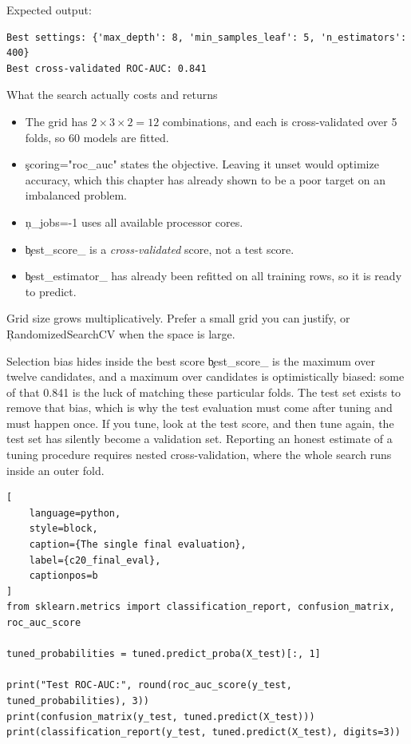 Expected output:

\begin{lstlisting}[language=text, style=block, caption={Twelve combinations, five folds, one winner}, label={c20_gridsearch_output}, captionpos=b]
Best settings: {'max_depth': 8, 'min_samples_leaf': 5, 'n_estimators': 400}
Best cross-validated ROC-AUC: 0.841
\end{lstlisting}

\begin{SyntaxBox}{What the search actually costs and returns}
\begin{itemize}
    \item The grid has $2 \times 3 \times 2 = 12$ combinations, and each is
          cross-validated over 5 folds, so 60 models are fitted.
    \item \c{scoring="roc_auc"} states the objective. Leaving it unset would
          optimize accuracy, which this chapter has already shown to be a poor
          target on an imbalanced problem.
    \item \c{n_jobs=-1} uses all available processor cores.
    \item \c{best_score_} is a \emph{cross-validated} score, not a test score.
    \item \c{best_estimator_} has already been refitted on all training rows, so
          it is ready to predict.
\end{itemize}
Grid size grows multiplicatively. Prefer a small grid you can justify, or
\c{RandomizedSearchCV} when the space is large.
\end{SyntaxBox}

\begin{ExplainBox}{Selection bias hides inside the best score}
\c{best_score_} is the maximum over twelve candidates, and a maximum over
candidates is optimistically biased: some of that 0.841 is the luck of matching
these particular folds. The test set exists to remove that bias, which is why the
test evaluation must come after tuning and must happen once. If you tune, look at
the test score, and then tune again, the test set has silently become a
validation set. Reporting an honest estimate of a tuning procedure requires
nested cross-validation, where the whole search runs inside an outer fold.
\end{ExplainBox}


\begin{lstlisting}[
    language=python,
    style=block,
    caption={The single final evaluation},
    label={c20_final_eval},
    captionpos=b
]
from sklearn.metrics import classification_report, confusion_matrix, roc_auc_score

tuned_probabilities = tuned.predict_proba(X_test)[:, 1]

print("Test ROC-AUC:", round(roc_auc_score(y_test, tuned_probabilities), 3))
print(confusion_matrix(y_test, tuned.predict(X_test)))
print(classification_report(y_test, tuned.predict(X_test), digits=3))
\end{lstlisting}

